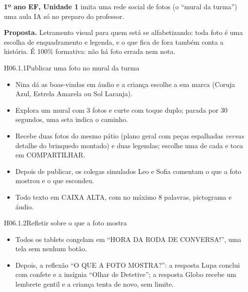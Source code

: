 
\textbf{1º ano EF, Unidade 1} \textperiodcentered{} imita uma rede social de
fotos (o \enquote{mural da turma}) \textperiodcentered{} uma aula
\textperiodcentered{} IA só no preparo do professor.

\textbf{Proposta.} Letramento visual para quem está se alfabetizando: toda
foto é uma escolha de enquadramento e legenda, e o que fica de fora também
conta a história. É 100\% formativa: não há foto errada nem nota.

\begin{historia}{H06.1.1}{Publicar uma foto no mural da turma}{\parcial}
\aceite
\begin{itemize}
  \item Nina dá as boas-vindas em áudio e a criança escolhe a sua marca
    (Coruja Azul, Estrela Amarela ou Sol Laranja).
  \item Explora um mural com 3 fotos e curte com toque duplo; parada por 30
    segundos, uma seta indica o caminho.
  \item Recebe duas fotos do mesmo pátio (plano geral com peças espalhadas
    \emph{versus} detalhe do brinquedo montado) e duas legendas; escolhe uma
    de cada e toca em COMPARTILHAR.
  \item Depois de publicar, os colegas simulados Leo e Sofia comentam o que a
    foto mostrou e o que escondeu.
  \item Todo texto em CAIXA ALTA, com no máximo 8 palavras, pictograma e
    áudio.
\end{itemize}
\end{historia}

\begin{historia}{H06.1.2}{Refletir sobre o que a foto mostra}{\pronto}
\aceite
\begin{itemize}
  \item Todos os tablets congelam em \enquote{HORA DA RODA DE CONVERSA!}, uma
    tela sem nenhum botão.
  \item Depois, a reflexão \enquote{O QUE A FOTO MOSTRA?}: a resposta Lupa
    conclui com confete e a insígnia \enquote{Olhar de Detetive}; a resposta
    Globo recebe um lembrete gentil e a criança tenta de novo, sem limite.
\end{itemize}
\end{historia}

